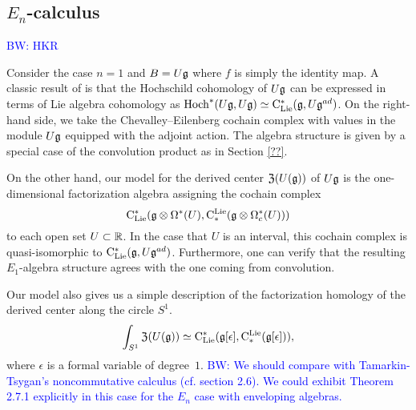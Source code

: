 \documentclass[11pt]{amsart}
\numberwithin{equation}{section}
\def\brian{\textcolor{blue}{BW: }\textcolor{blue}}
\begin{document}
\subsection{$E_n$-calculus}
\label{sec: TT}

\brian{HKR}

Consider the case $n=1$ and $B = U \mathfrak g$ where $f$ is simply the identity map. 
A classic result of \cite{HochSerre} is that the Hochschild cohomology of $U \mathfrak g$ can be expressed in terms of Lie algebra cohomology as ${\rm Hoch}^*(U\mathfrak g,U\mathfrak g) \simeq {\rm C}_{\rm Lie}^*(\mathfrak g, U\mathfrak g^{ad})$. 
On the right-hand side, we take the Chevalley--Eilenberg cochain complex with values in the module $U \mathfrak g$ equipped with the adjoint action.
The algebra structure is given by a special case of the convolution product as in Section \ref{??}. 

On the other hand, our model for the derived center ${\frak Z}(U(\mathfrak g))$ of $U \mathfrak g$ is the one-dimensional factorization algebra assigning the cochain complex
\[
{\rm C}_{\rm Lie}^*(\mathfrak g \otimes \Omega^*(U), {\rm C}^{\rm Lie}_*( \mathfrak g \otimes \Omega^*_c(U)))
\]
to each open set $U \subset \mathbb R$.
In the case that $U$ is an interval, this cochain complex is quasi-isomorphic to ${\rm C}_{\rm Lie}^* (\mathfrak g , U\mathfrak g^{ad})$.
Furthermore, one can verify that the resulting $E_1$-algebra structure agrees with the one coming from convolution. 

Our model also gives us a simple description of the factorization homology of the derived center along the circle $S^1$.
\[
\int_{S^1} {\frak Z}(U(\mathfrak g)) \simeq {\rm C}_{\rm Lie}^*(\mathfrak g[\epsilon], {\rm C}^{\rm Lie}_*( \mathfrak g[\epsilon])),
\]
where $\epsilon$ is a formal variable of degree~$1$. 
\brian{We should compare with Tamarkin-Tsygan's noncommutative calculus (cf. section 2.6).
We could exhibit Theorem 2.7.1 explicitly in this case for the $E_n$ case with enveloping algebras.}

%



  


%  
\end{document}

